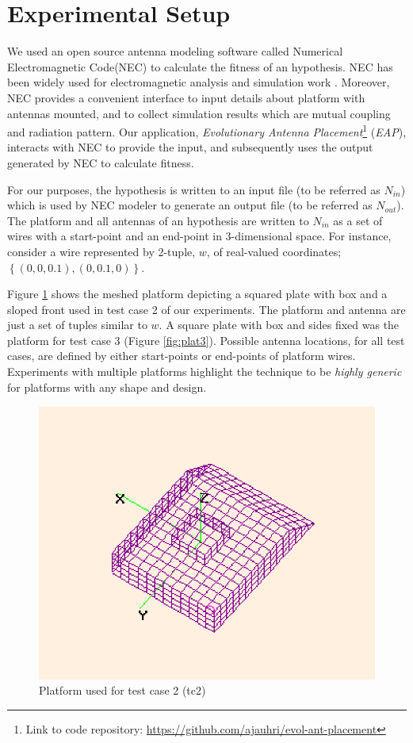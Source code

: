 \documentclass{sig-alternate}
\begin{document}
\section{Experimental Setup}
\label{sec:setup}
We used an open source antenna modeling software called Numerical Electromagnetic Code(NEC)\cite{burke1981numerical} to calculate the fitness of an hypothesis. NEC has been widely used for electromagnetic analysis and simulation work \cite{topa2011using, pokharel2003numerical}. Moreover, NEC provides a convenient interface to input details about platform with antennas mounted, and to collect simulation results which are mutual coupling and radiation pattern. Our application, \textit{Evolutionary Antenna Placement}\footnote{Link to code repository: \url{https://github.com/ajauhri/evol-ant-placement}} (\textit{EAP}), interacts with NEC to provide the input, and subsequently uses the output generated by NEC to calculate fitness. 

For our purposes, the hypothesis is written to an input file (to be referred as $N_{in}$) which is used by NEC modeler to generate an output file (to be referred as $N_{out}$). The platform and all antennas of an hypothesis are written to $N_{in}$ as a set of wires with a start-point and an end-point in 3-dimensional space. For instance, consider a wire represented by 2-tuple, $w$, of real-valued coordinates; $\left\{(0,0,0.1), (0,0.1,0)\right\}$. 

Figure \ref{fig:plat2} shows the meshed platform depicting a squared plate with box and a sloped front used in test case 2 of our experiments. The platform and antenna are just a set of tuples similar to $w$. A square plate with box and sides fixed was the platform for test case 3 (Figure \ref{fig:plat3}). Possible antenna locations, for all test cases, are defined by either start-points or end-points of platform wires. Experiments with multiple platforms highlight the technique to be \textit{highly generic} for platforms with any shape and design. 
\begin{figure}
    \begin{center}
        \includegraphics[width=.41\textwidth]{FIG/s6}
\end{center}
\caption{Platform used for test case 2 (tc2)}
\label{fig:plat2}
\end{figure}
\end{document}
